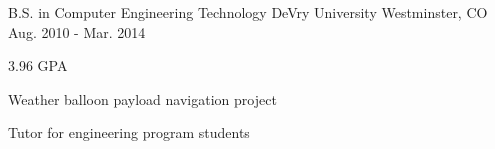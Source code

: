 

\begin{cventries}

  \cventry
    {B.S. in Computer Engineering Technology} %
    {DeVry University} %
    {Westminster, CO} %
    {Aug. 2010 - Mar. 2014} %
    {
      \begin{cvitems} %
        \item {3.96 GPA}
        \item {Weather balloon payload navigation project}
        \item {Tutor for engineering program students}
      \end{cvitems}
    }

\end{cventries}
